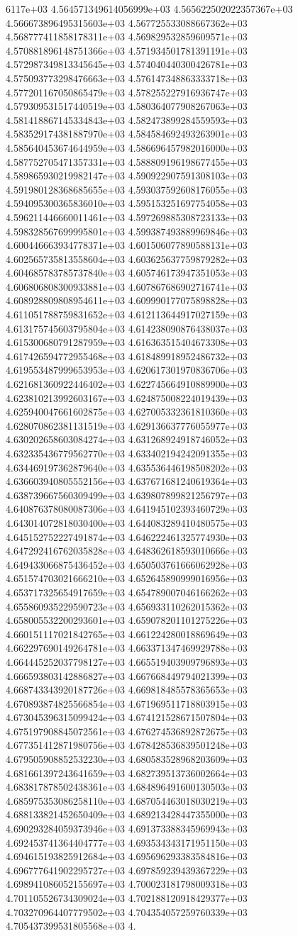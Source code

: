 6117e+03	4.564571349614056999e+03	4.565622502022357367e+03	4.566673896495315603e+03	4.567725533088667362e+03	4.568777411858178311e+03	4.569829532859609571e+03	4.570881896148751366e+03	4.571934501781391191e+03	4.572987349813345645e+03	4.574040440300426781e+03	4.575093773298476663e+03	4.576147348863333718e+03	4.577201167050865479e+03	4.578255227916936747e+03	4.579309531517440519e+03	4.580364077908267063e+03	4.581418867145334843e+03	4.582473899284559593e+03	4.583529174381887970e+03	4.584584692493263901e+03	4.585640453674644959e+03	4.586696457982016000e+03	4.587752705471357331e+03	4.588809196198677455e+03	4.589865930219982147e+03	4.590922907591308103e+03	4.591980128368685655e+03	4.593037592608176055e+03	4.594095300365836010e+03	4.595153251697754058e+03	4.596211446660011461e+03	4.597269885308723133e+03	4.598328567699995801e+03	4.599387493889969846e+03	4.600446663934778371e+03	4.601506077890588131e+03	4.602565735813558604e+03	4.603625637759879282e+03	4.604685783785737840e+03	4.605746173947351053e+03	4.606806808300933881e+03	4.607867686902716741e+03	4.608928809808954611e+03	4.609990177075898828e+03	4.611051788759831652e+03	4.612113644917027159e+03	4.613175745603795804e+03	4.614238090876438037e+03	4.615300680791287959e+03	4.616363515404673308e+03	4.617426594772955468e+03	4.618489918952486732e+03	4.619553487999653953e+03	4.620617301970836706e+03	4.621681360922446402e+03	4.622745664910889900e+03	4.623810213992603167e+03	4.624875008224019439e+03	4.625940047661602875e+03	4.627005332361810360e+03	4.628070862381131519e+03	4.629136637776055977e+03	4.630202658603084274e+03	4.631268924918746052e+03	4.632335436779562770e+03	4.633402194242091355e+03	4.634469197362879640e+03	4.635536446198508202e+03	4.636603940805552156e+03	4.637671681240619364e+03	4.638739667560309499e+03	4.639807899821256797e+03	4.640876378080087306e+03	4.641945102393460729e+03	4.643014072818030400e+03	4.644083289410480575e+03	4.645152752227491874e+03	4.646222461325774930e+03	4.647292416762035828e+03	4.648362618593010666e+03	4.649433066875436452e+03	4.650503761666062928e+03	4.651574703021666210e+03	4.652645890999016956e+03	4.653717325654917659e+03	4.654789007046166262e+03	4.655860935229590723e+03	4.656933110262015362e+03	4.658005532200293601e+03	4.659078201101275226e+03	4.660151117021842765e+03	4.661224280018869649e+03	4.662297690149264781e+03	4.663371347469929788e+03	4.664445252037798127e+03	4.665519403909796893e+03	4.666593803142886827e+03	4.667668449794021399e+03	4.668743343920187726e+03	4.669818485578365653e+03	4.670893874825566854e+03	4.671969511718803915e+03	4.673045396315099424e+03	4.674121528671507804e+03	4.675197908845072561e+03	4.676274536892872675e+03	4.677351412871980756e+03	4.678428536839501248e+03	4.679505908852532230e+03	4.680583528968203609e+03	4.681661397243641659e+03	4.682739513736002664e+03	4.683817878502438361e+03	4.684896491600130503e+03	4.685975353086258110e+03	4.687054463018030219e+03	4.688133821452650409e+03	4.689213428447355000e+03	4.690293284059373946e+03	4.691373388345969943e+03	4.692453741364404777e+03	4.693534343171951150e+03	4.694615193825912684e+03	4.695696293383584816e+03	4.696777641902295727e+03	4.697859239439367229e+03	4.698941086052155697e+03	4.700023181798009318e+03	4.701105526734309024e+03	4.702188120918429377e+03	4.703270964407779502e+03	4.704354057259760339e+03	4.705437399531805568e+03	4.